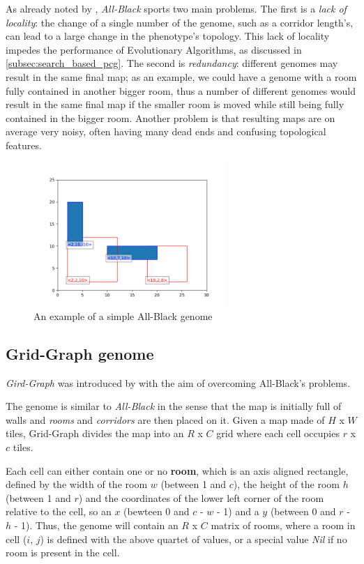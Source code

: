 \documentclass{Configuration_Files/PoliMi3i_thesis}
\begin{document}
As already noted by \citeauthor{bari_evolutionary-based_2023}, \textit{All-Black} sports two main problems. The first is a \textit{lack of locality}: the change of a single number of the genome, such as a corridor length's, can lead to a large change in the phenotype's topology. This lack of locality impedes the performance of Evolutionary Algorithms, as discussed in \ref{subsec:search_based_pcg}. The second is \textit{redundancy}: different genomes may result in the same final map; as an example, we could have a genome with a room fully contained in another bigger room, thus a number of different genomes would result in the same final map if the smaller room is moved while still being fully contained in the bigger room. Another problem is that resulting maps are on average very noisy, often having many dead ends and confusing topological features.

\begin{figure}[hbt!]
    \centering
    \includegraphics[width=0.65\textwidth]{images/ABGenome.png}
    \caption[All-Black example]{An example of a simple All-Black genome}
    \label{fig:all_black}
\end{figure}

\subsection{Grid-Graph genome}
\label{subsec:grid_graph}
\textit{Gird-Graph} was introduced by \citeauthor{bari_evolutionary-based_2023} with the aim of overcoming All-Black's problems.

The genome is similar to \textit{All-Black} in the sense that the map is initially full of walls and \textit{rooms} and \textit{corridors} are then placed on it. Given a map made of $H$ x $W$ tiles, Grid-Graph divides the map into an $R$ x $C$ grid where each cell occupies $r$ x $c$ tiles. 

Each cell can either contain one or no \textbf{room}, which is an axis aligned rectangle, defined by the width of the room $w$ (between 1 and $c$), the height of the room $h$ (between 1 and $r$) and the coordinates of the lower left corner of the room relative to the cell, so an $x$ (bewteen 0 and $c$ - $w$ - 1) and a $y$ (between 0 and $r$ - $h$ - 1). Thus, the genome will contain an $R$ x $C$ matrix of rooms, where a room in cell ($i$, $j$) is defined with the above quartet of values, or a special value \textit{Nil} if no room is present in the cell.
\end{document}
